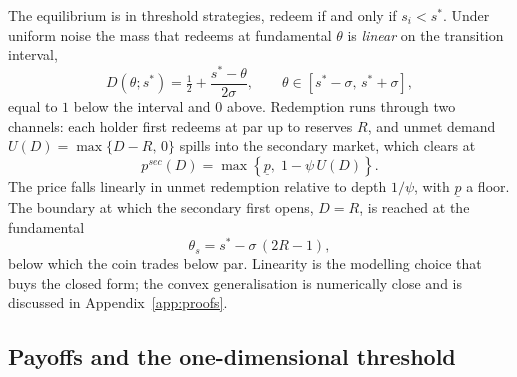 The equilibrium is in threshold strategies, redeem if and only if $s_i < s^*$. Under uniform noise the mass that redeems at fundamental $\theta$ is \emph{linear} on the transition interval,
\begin{equation}\label{eq:D}
D(\theta; s^*) = \tfrac{1}{2} + \frac{s^* - \theta}{2\sigma}, \qquad \theta \in [s^*-\sigma,\, s^*+\sigma],
\end{equation}
equal to $1$ below the interval and $0$ above. Redemption runs through two channels: each holder first redeems at par up to reserves $R$, and unmet demand $U(D) = \max\{D - R,\, 0\}$ spills into the secondary market, which clears at
\begin{equation}\label{eq:psec}
p^{sec}(D) = \max\!\left\{\underline{p},\; 1 - \psi\, U(D)\right\}.
\end{equation}
The price falls linearly in unmet redemption relative to depth $1/\psi$, with $\underline p$ a floor. The boundary at which the secondary first opens, $D = R$, is reached at the fundamental
\begin{equation}\label{eq:theta_s}
\theta_s = s^* - \sigma\,(2R - 1),
\end{equation}
below which the coin trades below par. Linearity is the modelling choice that buys the closed form; the convex generalisation is numerically close and is discussed in Appendix~\ref{app:proofs}.

\subsection{Payoffs and the one-dimensional threshold}\label{sub:model_equilibrium}

